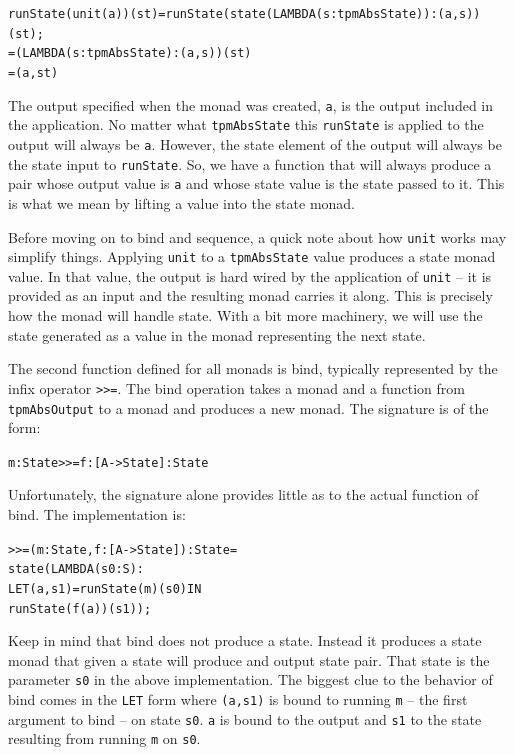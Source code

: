 \documentclass[10pt]{article}
\begin{document}
\begin{alltt}
  runState(unit(a))(st) = runState(state(LAMBDA (s:tpmAbsState)) :  (a,s))(st);
                        = (LAMBDA (s:tpmAbsState) : (a,s))(st)
                        = (a,st)
\end{alltt}

The output specified when the monad was created, \verb!a!, is the
output included in the application.  No matter what \verb!tpmAbsState!
this \verb!runState! is applied to the output will always be
\verb!a!.  However, the state element of the output will always be the
state input to \verb!runState!.  So, we have a function that will
always produce a pair whose output value is \verb!a! and whose state
value is the state passed to it.  This is what we mean by lifting a
value into the state monad.


Before moving on to bind and sequence, a quick note about how
\verb!unit! works may simplify things.  Applying \verb!unit! to a
\verb!tpmAbsState! value produces a state monad value.  In that value,
the output is hard wired by the application of \verb!unit! -- it is
provided as an input and the resulting monad carries it along.  This
is precisely how the monad will handle state.  With a bit more
machinery, we will use the state generated as a value in the monad
representing the next state.

The second function defined for all monads is bind, typically
represented by the infix operator \verb!>>=!.  The bind operation
takes a monad and a function from \verb!tpmAbsOutput! to a monad and
produces a new monad.  The signature is of the form:

\begin{alltt}
  m:State >>= f:[A->State] : State
\end{alltt}

Unfortunately, the signature alone provides little as to the actual
function of bind.  The implementation is:

\begin{alltt}
 >>= (m:State,f:[A->State]):State =
   state(LAMBDA(s0:S):
          LET (a,s1) = runState(m)(s0) IN 
	    runState(f(a))(s1));
\end{alltt}

Keep in mind that bind does not produce a state.  Instead it produces
a state monad that given a state will produce and output state pair.
That state is the parameter \verb!s0! in the above implementation.
The biggest clue to the behavior of bind comes in the \verb!LET! form
where \verb!(a,s1)! is bound to running \verb!m! -- the first argument
to bind -- on state \verb!s0!.  \verb!a! is bound to the output and
\verb!s1! to the state resulting from running \verb!m! on \verb!s0!.
\end{document}
